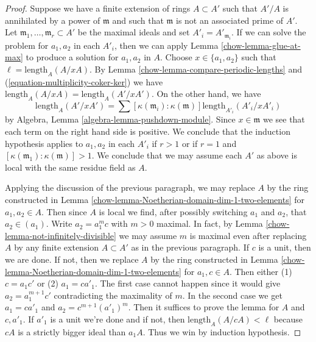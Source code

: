 \begin{proof}
\medskip\noindent
Suppose we have a finite extension of rings $A \subset A'$ such that
$A'/A$ is annihilated by a power of $\mathfrak m$ and such that
$\mathfrak m$ is not an associated prime of $A'$.
Let $\mathfrak m_1, \ldots, \mathfrak m_r \subset A'$
be the maximal ideals and set $A'_i = A'_{\mathfrak m_i}$.
If we can solve the problem for $a_1, a_2$ in each $A'_i$,
then we can apply Lemma \ref{chow-lemma-glue-at-max}
to produce a solution for $a_1, a_2$ in $A$.
Choose $x \in \{a_1, a_2\}$ such that $\ell = \text{length}_A(A/xA)$.
By Lemma \ref{chow-lemma-compare-periodic-lengths}
and (\ref{equation-multiplicity-coker-ker})
we have $\text{length}_A(A/xA) = \text{length}_A(A'/xA')$.
On the other hand, we have
$$
\text{length}_A(A'/xA') =
\sum [\kappa(\mathfrak m_i) : \kappa(\mathfrak m)]
\text{length}_{A'_i}(A'_i/xA'_i)
$$
by Algebra, Lemma \ref{algebra-lemma-pushdown-module}.
Since $x \in \mathfrak m$ we see that each term on the right hand side
is positive. We conclude that the induction hypothesis applies
to $a_1, a_2$ in each $A'_i$ if $r > 1$ or if $r = 1$ and
$[\kappa(\mathfrak m_1) : \kappa(\mathfrak m)] > 1$.
We conclude that we may assume each $A'$ as above is local with
the same residue field as $A$.

\medskip\noindent
Applying the discussion of the previous paragraph,
we may replace $A$ by the ring constructed in
Lemma \ref{chow-lemma-Noetherian-domain-dim-1-two-elements}
for $a_1, a_2 \in A$. Then since $A$ is local we find,
after possibly switching $a_1$ and $a_2$, that $a_2 \in (a_1)$.
Write $a_2 = a_1^m c$ with $m > 0$ maximal. In fact, by
Lemma \ref{chow-lemma-not-infinitely-divisible}
we may assume $m$ is maximal even after replacing $A$
by any finite extension $A \subset A'$ as in the previous paragraph.
If $c$ is a unit, then we are done. If not, then we replace
$A$ by the ring constructed in
Lemma \ref{chow-lemma-Noetherian-domain-dim-1-two-elements}
for $a_1, c \in A$. Then either (1) $c = a_1 c'$ or
(2) $a_1 = c a'_1$. The first case cannot happen since
it would give $a_2 = a_1^{m + 1} c'$ contradicting the
maximality of $m$. In the second case we get
$a_1 = c a'_1$ and $a_2 = c^{m + 1} (a'_1)^m$.
Then it suffices to prove the lemma for $A$ and $c, a'_1$.
If $a'_1$ is a unit we're done and if not, then
$\text{length}_A(A/cA) < \ell$ because $cA$ is a strictly
bigger ideal than $a_1A$. Thus we win by induction hypothesis.
\end{proof}

